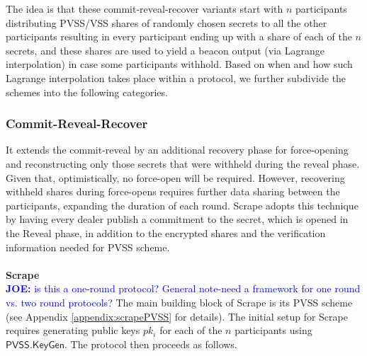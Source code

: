 \documentclass[letterpaper,twocolumn,10pt]{article}
\theoremstyle{definition}
\theoremstyle{remark}
\newcommand{\joenote}[1]{\textcolor{blue}{\textbf{JOE:} #1}}
\begin{document}
The idea is that these commit-reveal-recover variants start with $n$ participants distributing PVSS/VSS shares of randomly chosen secrets to all the other participants resulting in every participant ending up with a share of each of the $n$ secrets, and these shares are used to yield a beacon output (via Lagrange interpolation) in case some participants withhold. Based on when and how such Lagrange interpolation takes place within a protocol, we further subdivide the schemes into the following categories.

\subsubsection{Commit-Reveal-Recover}
It extends the commit-reveal by an additional recovery phase for force-opening and reconstructing only those secrets that were withheld during the reveal phase. Given that, optimistically, no force-open will be required. However, recovering withheld shares during force-opens requires  further data sharing between the participants, expanding the duration of each round. Scrape \cite{cascudo2017scrape} adopts this technique by having every dealer publish a commitment to the secret, which is opened in the Reveal phase, in addition to the encrypted shares and the verification information needed for PVSS scheme.\\\\
\textbf{Scrape}\\
\joenote{is this a one-round protocol? General note-need a framework for one round vs. two round protocols?}
The main building block of Scrape is its PVSS scheme (see Appendix \ref{appendix:scrapePVSS} for details). The initial setup for Scrape requires generating public keys $pk_i$ for each of the $n$ participants using $\mathsf{PVSS.KeyGen}$. The protocol then proceeds as follows.
\end{document}
